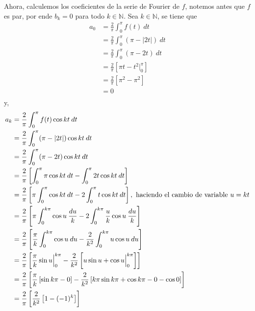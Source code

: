 \documentclass[12pt]{report}
\theoremstyle{largebreak}
\newcommand\abs[1]{\ensuremath{\left|#1\right|}}
\begin{document}
\begin{sol}
        Ahora, calculemos los coeficientes de la serie de Fourier de $f$, notemos antes que $f$ es par, por ende $b_k=0$ para todo $k\in\mathbb{N}$. Sea $k\in\mathbb{N}$, se tiene que
        \begin{equation*}
            \begin{split}
                a_0&=\frac{2}{\pi}\int_{0}^{\pi}f(t)\:dt\\
                &=\frac{2}{\pi}\int_{0}^{\pi}(\pi-\abs{2t})\:dt\\
                &=\frac{2}{\pi}\int_{0}^{\pi}(\pi-2t)\:dt\\
                &=\frac{2}{\pi}\left[\pi t-t^2\Big|_0^\pi \right] \\
                &=\frac{2}{\pi}\left[\pi^2-\pi^2\right] \\
                &=0\\
            \end{split}
        \end{equation*}
        y,
        \begin{equation*}
            \begin{split}
                a_k&=\frac{2}{\pi}\int_{0}^{\pi}f(t)\cos kt\:dt\\
                &=\frac{2}{\pi}\int_{0}^{\pi}(\pi-\abs{2t})\cos kt\:dt\\
                &=\frac{2}{\pi}\int_{0}^{\pi}(\pi-2t)\cos kt\:dt\\
                &=\frac{2}{\pi}\left[\int_{0}^{\pi}\pi\cos kt\:dt-\int_{0}^{\pi}2t\cos kt\:dt\right]\\
                &=\frac{2}{\pi}\left[\pi\int_{0}^{\pi}\cos kt\:dt-2\int_{0}^{\pi}t\cos kt\:dt\right],\textup{ haciendo el cambio de variable }u=kt \\
                &=\frac{2}{\pi}\left[\pi\int_{0}^{k\pi}\cos u\:\frac{du}{k}-2\int_{0}^{k\pi}\frac{u}{k}\cos u\:\frac{du}{k} \right]\\
                &=\frac{2}{\pi}\left[\frac{\pi}{k}\int_{0}^{k\pi}\cos u\:du-\frac{2}{k^2}\int_{0}^{k\pi}u\cos u\:du\right]\\
                &=\frac{2}{\pi}\left[\frac{\pi}{k}\sin u\Big|_{0}^{k\pi} -\frac{2}{k^2}\left[u\sin u+\cos u\Big|_{0}^{k\pi}\right] \right]\\
                &=\frac{2}{\pi}\left[\frac{\pi}{k}\left[\sin k\pi-0 \right] -\frac{2}{k^2}\left[k\pi\sin k\pi+\cos k\pi-0-\cos0\right] \right]\\
                &=\frac{2}{\pi}\left[\frac{2}{k^2}\left[1-(-1)^k\right]\right]\\

\end{split}
\end{equation*}
\end{sol}
\end{document}

